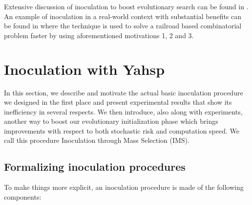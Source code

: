 \documentclass[english]{DESCARWINreport}
\begin{document}
Extensive discussion of inoculation to boost evolutionary search can be found in \cite{Surry96, SurryPhD}. An example of inoculation in a real-world context with substantial benefits can be found in \cite{semetGECCO06} where the technique is used to solve a railroad based combinatorial problem faster by using aforementioned motivations 1, 2 and 3.






\newpage
\chapter{Inoculation with Yahsp}

In this section, we describe and motivate the actual basic inoculation procedure we designed in the first place and present experimental results that show its inefficiency in several respects. We then introduce, also along with experiments, another way to boost our evolutionary initialization phase which brings improvements with respect to both stochastic risk and computation speed. We call this procedure Inoculation through Mass Selection (IMS).

\section{Formalizing inoculation procedures}

To make things more explicit, an inoculation procedure is made of the following components:
\end{document}
